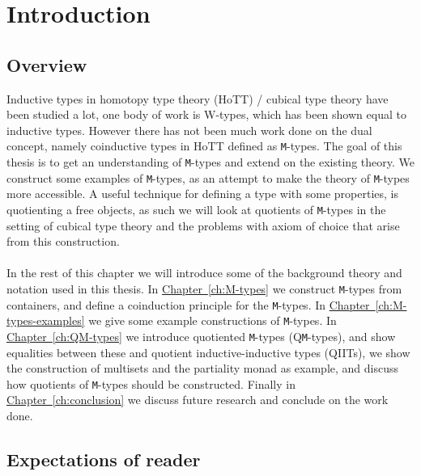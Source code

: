 \documentclass[twoside,11pt,openright]{report}
\theoremstyle{plain} %
\theoremstyle{definition}
\theoremstyle{remark}
\newcommand*{\chapterref}[1]{\hyperref[ch:#1]{Chapter~\ref*{ch:#1}}}
\begin{document}
\chapter{Introduction} %
\label{ch:intro}

\section{Overview}
Inductive types in homotopy type theory (HoTT) / cubical type theory have been studied a lot, one body of work is W-types, which has been shown equal to inductive types. However there has not been much work done on the dual concept, namely coinductive types in HoTT defined as \texttt{M}-types. The goal of this thesis is to get an understanding of \texttt{M}-types and extend on the existing theory. We construct some examples of \texttt{M}-types, as an attempt to make the theory of \texttt{M}-types more accessible. A useful technique for defining a type with some properties, is quotienting a free objects, as such we will look at quotients of \texttt{M}-types in the setting of cubical type theory and the problems with axiom of choice that arise from this construction.
\\ \\
In the rest of this chapter we will introduce some of the background theory and notation used in this thesis. In \chapterref{M-types} we construct \texttt{M}-types from containers, and define a coinduction principle for the \texttt{M}-types. In \chapterref{M-types-examples} we give some example constructions of \texttt{M}-types. In \chapterref{QM-types} we introduce quotiented \texttt{M}-types (Q\texttt{M}-types), and show equalities between these and quotient inductive-inductive types (QIITs), we show the construction of multisets and the partiality monad as example, and discuss how quotients of \texttt{M}-types should be constructed. Finally in \chapterref{conclusion} we discuss future research and conclude on the work done.

\section{Expectations of reader}
\end{document}
